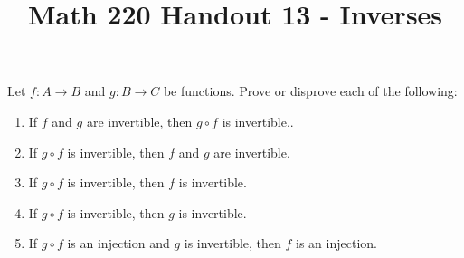 \documentclass[12pt, reqno]{amsart}
\begin{document}
\title[Math 220 Handout 13 - Inverses]{Math 220 Handout 13 - Inverses}\maketitle


 Let $f\colon A \to B$ and $g \colon B \to C$ be functions. Prove or
  disprove each of the following:
  \begin{enumerate}
  \item If $f$ and $g$ are invertible, then $g \circ f$ is invertible..
  \item If $g \circ f$ is invertible, then $f$ and $g$ are invertible.
  \item If $g \circ f$ is invertible, then $f$ is invertible.
  \item If $g \circ f$ is invertible, then $g$ is invertible.
  \item If $g \circ f$ is an injection and $g$ is invertible, then $f$ is an
    injection.
  \end{enumerate}
\end{document}
